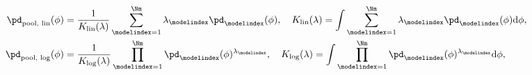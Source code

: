 \begin{align}
  \pd_{\text{pool, lin}}(\phi) &=
    \frac{1}{K_{\text{lin}}(\lambda)}
    \sum_{\modelindex = 1}^{\Nm} \lambda_{\modelindex} \pd_{\modelindex}(\phi), \quad
  K_{\text{lin}}(\lambda) = \int \sum_{\modelindex = 1}^{\Nm} \lambda_{\modelindex} \pd_{\modelindex}(\phi) \text{d}\phi, \label{eqn:orig-pooling-linear}\\
  \pd_{\text{pool, log}}(\phi) &=  
    \frac{1}{K_{\text{log}}(\lambda)}
    \prod_{\modelindex = 1}^{\Nm} \pd_{\modelindex}(\phi)^{\lambda_{\modelindex}}, \quad
  K_{\text{log}}(\lambda) = \int \prod_{\modelindex = 1}^{\Nm} \pd_{\modelindex}(\phi)^{\lambda_{\modelindex}} \text{d}\phi,
  \label{eqn:orig-pooling-logarithmic}
\end{align}